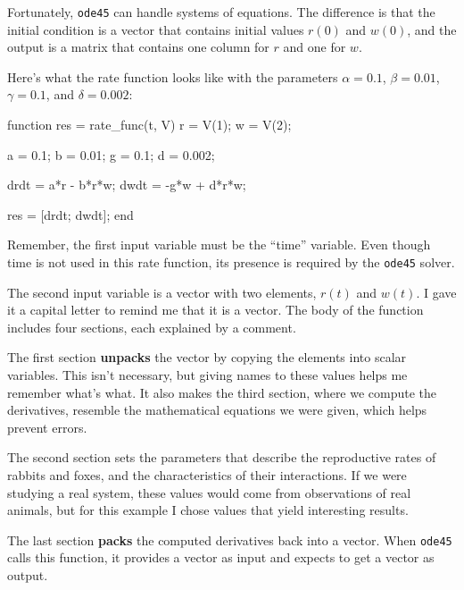 \documentclass[
]{book}
\numberwithin{Answer}{chapter}
\numberwithin{Exercise}{chapter}
\begin{document}
Fortunately, {\tt ode45} can handle systems of equations.  The
difference is that the initial condition is a vector that contains
initial values $r(0)$ and $w(0)$, and the output is a matrix
that contains one column for $r$ and one for $w$.


Here's what the rate function looks like
with the parameters $\alpha = 0.1$, $\beta = 0.01$, $\gamma = 0.1$, 
and $\delta = 0.002$:

\begin{code}
function res = rate_func(t, V)
    r = V(1);
    w = V(2);

    a = 0.1;  
    b = 0.01;  
    g = 0.1;   
    d = 0.002; 

    drdt = a*r - b*r*w;
    dwdt = -g*w + d*r*w;

    res = [drdt; dwdt];
end
\end{code}

Remember, the first input variable must be the ``time'' variable.
Even though time is not used in this rate function, its presence is required by the {\tt ode45} solver.

The second input variable is a vector with two elements,
$r(t)$ and $w(t)$.  I gave it a capital letter to remind me that it
is a vector.  The body of the function includes four sections,
each explained by a comment.

The first section {\bf unpacks} the vector by copying the elements
into scalar variables.  This isn't necessary, but giving names to
these values helps me remember what's what.  It also makes the third
section, where we compute the derivatives, resemble the mathematical
equations we were given, which helps prevent errors.


The second section sets the parameters that describe the
reproductive rates of rabbits and foxes, and the characteristics of
their interactions.  If we were studying a real system, these values
would come from observations of real animals, but for this example
I chose values that yield interesting results.


The last section {\bf packs} the computed derivatives back into a
vector.  When {\tt ode45} calls this function, it provides a vector
as input and expects to get a vector as output.
\end{document}
